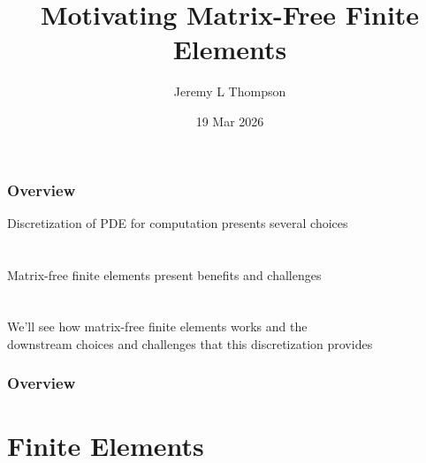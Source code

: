 \documentclass{beamer}
\title[libCEED Finite Element Library]{Motivating Matrix-Free Finite Elements} %
\author{Jeremy L Thompson} %
\institute[CU Boulder] %
{University of Colorado Boulder \\ %
\medskip
\textit{jeremy@jeremylt.org} %
}
\date{19 Mar 2026} %
\begin{document}
\begin{frame}
\titlepage %
\end{frame}


\begin{frame}
\begin{center}
\frametitle{Overview}

Discretization of PDE for computation presents several choices\\

~\\

~\\

Matrix-free finite elements present benefits and challenges\\

~\\

~\\

We'll see how matrix-free finite elements works and the\\
downstream choices and challenges that this discretization provides

\end{center}
\end{frame}
 

\begin{frame}
\frametitle{Overview} %
\tableofcontents
\end{frame}


\section{Finite Elements}
\end{document}
